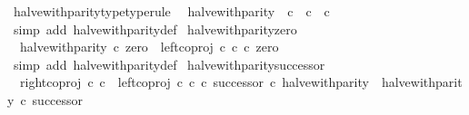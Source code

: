 \begin{isabellebody}
\endisatagproof
{\isafoldproof}%
%
\isadelimproof
\isanewline
%
\endisadelimproof
\isanewline
{}\isamarkupfalse%
\ halve{\isacharunderscore}{\kern0pt}with{\isacharunderscore}{\kern0pt}parity{\isacharunderscore}{\kern0pt}type{\isacharbrackleft}{\kern0pt}type{\isacharunderscore}{\kern0pt}rule{\isacharbrackright}{\kern0pt}{\isacharcolon}{\kern0pt}\isanewline
\ \ {\isachardoublequoteopen}halve{\isacharunderscore}{\kern0pt}with{\isacharunderscore}{\kern0pt}parity\ {\isacharcolon}{\kern0pt}\ {\isasymnat}\isactrlsub c\ {\isasymrightarrow}\ {\isasymnat}\isactrlsub c\ {\isasymCoprod}\ {\isasymnat}\isactrlsub c{\isachardoublequoteclose}\isanewline
%
\isadelimproof
\ \ %
\endisadelimproof
%
\isatagproof
{}\isamarkupfalse%
\ {\isacharparenleft}{\kern0pt}simp\ add{\isacharcolon}{\kern0pt}\ halve{\isacharunderscore}{\kern0pt}with{\isacharunderscore}{\kern0pt}parity{\isacharunderscore}{\kern0pt}def{}{\isacharparenright}{\kern0pt}%
\endisatagproof
{\isafoldproof}%
%
\isadelimproof
\isanewline
%
\endisadelimproof
\isanewline
{}\isamarkupfalse%
\ halve{\isacharunderscore}{\kern0pt}with{\isacharunderscore}{\kern0pt}parity{\isacharunderscore}{\kern0pt}zero{\isacharcolon}{\kern0pt}\isanewline
\ \ {\isachardoublequoteopen}halve{\isacharunderscore}{\kern0pt}with{\isacharunderscore}{\kern0pt}parity\ {\isasymcirc}\isactrlsub c\ zero\ {\isacharequal}{\kern0pt}\ left{\isacharunderscore}{\kern0pt}coproj\ {\isasymnat}\isactrlsub c\ {\isasymnat}\isactrlsub c\ {\isasymcirc}\isactrlsub c\ zero{\isachardoublequoteclose}\isanewline
%
\isadelimproof
\ \ %
\endisadelimproof
%
\isatagproof
{}\isamarkupfalse%
\ {\isacharparenleft}{\kern0pt}simp\ add{\isacharcolon}{\kern0pt}\ halve{\isacharunderscore}{\kern0pt}with{\isacharunderscore}{\kern0pt}parity{\isacharunderscore}{\kern0pt}def{}{\isacharparenright}{\kern0pt}%
\endisatagproof
{\isafoldproof}%
%
\isadelimproof
\isanewline
%
\endisadelimproof
\isanewline
{}\isamarkupfalse%
\ halve{\isacharunderscore}{\kern0pt}with{\isacharunderscore}{\kern0pt}parity{\isacharunderscore}{\kern0pt}successor{\isacharcolon}{\kern0pt}\isanewline
\ \ {\isachardoublequoteopen}{\isacharparenleft}{\kern0pt}right{\isacharunderscore}{\kern0pt}coproj\ {\isasymnat}\isactrlsub c\ {\isasymnat}\isactrlsub c\ {\isasymamalg}\ {\isacharparenleft}{\kern0pt}left{\isacharunderscore}{\kern0pt}coproj\ {\isasymnat}\isactrlsub c\ {\isasymnat}\isactrlsub c\ {\isasymcirc}\isactrlsub c\ successor{\isacharparenright}{\kern0pt}{\isacharparenright}{\kern0pt}\ {\isasymcirc}\isactrlsub c\ halve{\isacharunderscore}{\kern0pt}with{\isacharunderscore}{\kern0pt}parity\ {\isacharequal}{\kern0pt}\ halve{\isacharunderscore}{\kern0pt}with{\isacharunderscore}{\kern0pt}parity\ {\isasymcirc}\isactrlsub c\ successor{\isachardoublequoteclose}\isanewline

\end{isabellebody}
